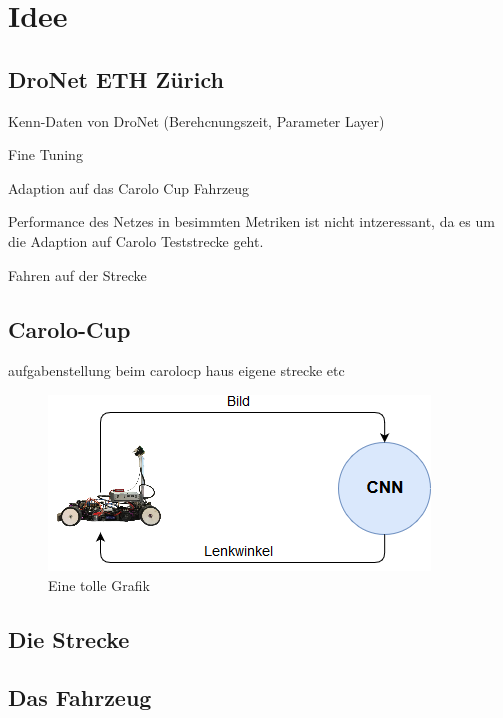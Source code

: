 %
\chapter{Idee}

\section{DroNet ETH Zürich}

Kenn-Daten von DroNet (Berehcnungszeit, Parameter Layer)

Fine Tuning 

Adaption auf das Carolo Cup Fahrzeug

Performance des Netzes in besimmten Metriken ist nicht intzeressant, da es um die Adaption auf Carolo Teststrecke geht.

Fahren auf der Strecke 


\section{Carolo-Cup}
aufgabenstellung beim carolocp
haus eigene strecke etc

\begin{figure}
	\centering
	\includegraphics[scale=0.7]{figures/Aufbau.png}
	\caption{Eine tolle Grafik}
	\label{img:toll ist das}
\end{figure}

\section{Die Strecke}

\section{Das Fahrzeug}


